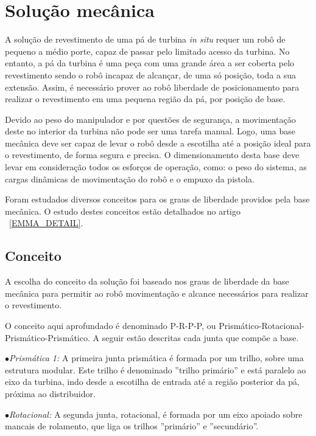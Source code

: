 \section{Solução mecânica}

A solução de revestimento de uma pá de turbina \textit{in situ} requer um robô
de pequeno a médio porte, capaz de passar pelo limitado acesso da turbina. 
No entanto, a pá da turbina é uma peça com uma grande área a ser coberta pelo
revestimento sendo o robô incapaz de alcançar, de uma só posição, toda a sua
extensão. Assim, é necessário prover ao robô liberdade de posicionamento
para realizar o revestimento em uma pequena região da pá, por posição de
base.

Devido ao peso do manipulador e por questões de segurança, a movimentação deste
no interior da turbina não pode ser uma tarefa manual. Logo, uma base mecânica
deve ser capaz de levar o robô desde a escotilha até a posição ideal
para o revestimento, de forma segura e precisa. O dimensionamento desta base deve levar
em consideração todos os esforços de operação, como: o peso do sistema, as
cargas dinâmicas de movimentação do robô e o empuxo da pistola. 

Foram estudados diversos conceitos para os graus de liberdade providos pela
base mecânica. O estudo destes conceitos estão detalhados no artigo 
~\ref{EMMA_DETAIL}.

\subsection{Conceito}

A escolha do conceito da solução foi baseado nos graus de liberdade da base
mecânica para permitir ao robô movimentação e alcance necessários para realizar 
o revestimento. 

O conceito aqui aprofundado é denominado P-R-P-P, ou
Prismático-Rotacional-Prismático-Prismático.
A seguir estão descritas cada junta que compõe a base.

$\bullet$\textit{Prismática 1:} A primeira junta prismática é formada por um
trilho, sobre uma estrutura modular. Este trilho é denominado ''trilho primário'' e está
paralelo ao eixo da turbina, indo desde a escotilha de entrada até a região 
posterior da pá, próxima ao distribuidor.

$\bullet$\textit{Rotacional:} A segunda junta, rotacional, é formada por um
eixo apoiado sobre mancais de rolamento, que liga os trilhos ''primário'' e ''secundário''. 

